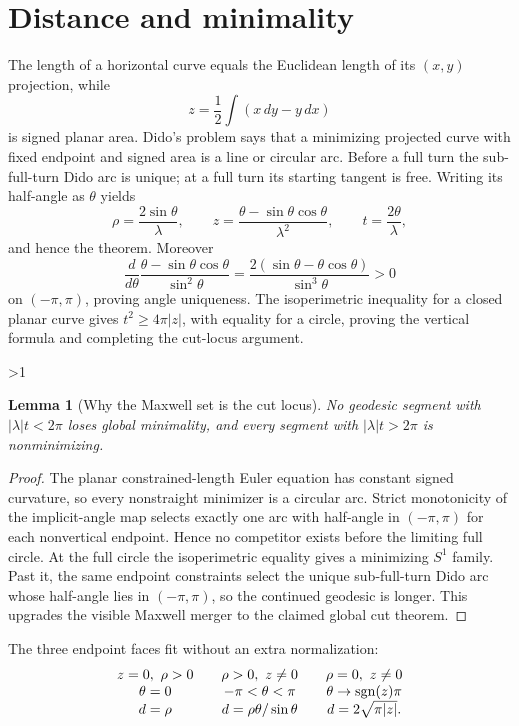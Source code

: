 \documentclass[10pt]{article}
\providecommand{\CRevisionRound}{2}
\newtheorem{lemma}{Lemma}
\begin{document}
\section{Distance and minimality}
The length of a horizontal curve equals the Euclidean length of its
$(x,y)$ projection, while
\[
 z=\frac12\int(x\,dy-y\,dx)
\]
is signed planar area.  Dido's problem says that a minimizing projected curve
with fixed endpoint and signed area is a line or circular arc.  Before a full
turn the sub-full-turn Dido arc is unique; at a full turn its starting tangent
is free.
Writing its half-angle as $\theta$ yields
\[
 \rho=\frac{2\sin\theta}{\lambda},\qquad
 z=\frac{\theta-\sin\theta\cos\theta}{\lambda^2},\qquad
 t=\frac{2\theta}{\lambda},
\]
and hence the theorem.  Moreover
\[
 \frac{d}{d\theta}\frac{\theta-\sin\theta\cos\theta}{\sin^2\theta}
 =\frac{2(\sin\theta-\theta\cos\theta)}{\sin^3\theta}>0
\]
on $(-\pi,\pi)$, proving angle uniqueness.  The isoperimetric inequality for a
closed planar curve gives $t^2\ge4\pi|z|$, with equality for a circle, proving
the vertical formula and completing the cut-locus argument.

\ifnum\CRevisionRound>1
\begin{lemma}[Why the Maxwell set is the cut locus]
No geodesic segment with $|\lambda|t<2\pi$ loses global minimality, and every
segment with $|\lambda|t>2\pi$ is nonminimizing.
\end{lemma}
\begin{proof}
The planar constrained-length Euler equation has constant signed curvature,
so every nonstraight minimizer is a circular arc.  Strict monotonicity of the
implicit-angle map selects exactly one arc with half-angle in $(-\pi,\pi)$ for
each nonvertical endpoint.  Hence no competitor exists before the limiting
full circle.  At the full circle the isoperimetric equality gives a minimizing
$S^1$ family.  Past it, the same endpoint constraints select the unique
sub-full-turn Dido arc whose half-angle lies in $(-\pi,\pi)$, so the continued
geodesic is longer.
This upgrades the visible Maxwell merger to the claimed global cut theorem.
\end{proof}

The three endpoint faces fit without an extra normalization:
\[
\begin{array}{c@{\qquad}c@{\qquad}c}
z=0,\ \rho>0 & \rho>0,\ z\ne0 & \rho=0,\ z\ne0\\
\theta=0 & -\pi<\theta<\pi & \theta\to\operatorname{sgn}(z)\pi\\
d=\rho & d=\rho\theta/\sin\theta & d=2\sqrt{\pi|z|}.
\end{array}
\]
\fi
\end{document}
